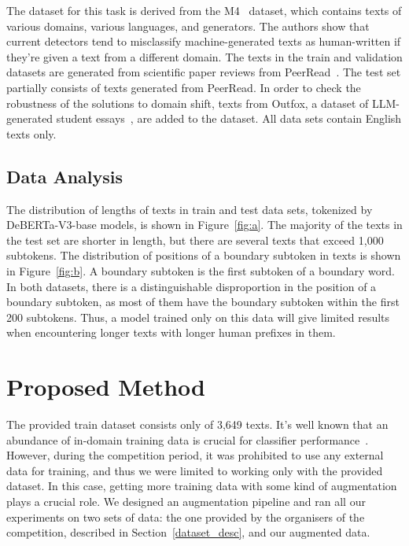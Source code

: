 \documentclass[11pt]{article}
\begin{document}
The dataset for this task is derived from the M4~\cite{wang2023m4} dataset, which contains  texts of various domains, various languages, and generators. The authors show that current detectors tend to misclassify machine-generated texts as human-written if they're given a text from a different domain. The texts in the train and validation datasets are generated from scientific paper reviews from PeerRead~\cite{kang-etal-2018-dataset}. The test set partially consists of texts generated from PeerRead.  In order to check the robustness of the solutions to domain shift, texts from Outfox, a dataset of LLM-generated student essays~\cite{koike2023outfox}, are added to the dataset. All data sets contain English texts only.

 \subsection{Data Analysis} 

The distribution of lengths of texts in train and test data sets, tokenized by DeBERTa-V3-base models, is shown in Figure~\ref{fig:a}.
The majority of the texts in the test set are shorter in length, but there are several texts that exceed 1,000 subtokens.
The distribution of positions of a boundary subtoken in texts is shown in Figure~\ref{fig:b}. A boundary subtoken is the first subtoken of a boundary word. In both datasets, there is a distinguishable disproportion in the position of a boundary subtoken, as most of them have the boundary subtoken within the first 200 subtokens. Thus, a model trained only  on this data will give limited results when encountering longer texts with longer human prefixes in them.

\section{Proposed Method}

The provided train dataset consists only of 3,649 texts. It's well known that an abundance of in-domain training data is crucial for classifier performance~\cite{konovalov2016collecting}. However, during the competition period, it was prohibited to use any external data for training, and thus we were limited to working only with the provided dataset. In this case, getting more training data with some kind of augmentation plays a crucial role. We designed an augmentation pipeline and ran all our experiments on two sets of data: the one provided by the organisers of the competition, described in Section~\ref{dataset_desc}, and our augmented data.
\end{document}
